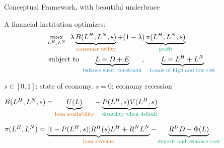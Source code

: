 \documentclass[notes,11pt, aspectratio=169]{beamer}
\newenvironment{wideitemize}{\itemize\addtolength{\itemsep}{10pt}}{\enditemize}  %
\begin{document}
\begin{frame}{Conceptual Framework, with beautiful underbrace}

A financial institution optimizes:
\begin{align*}
	& \max_{L^H, L^N}  \:\:  \lambda \underbrace{ B(L^H,L^N, s)}_{\text{\textcolor{red}{consumer utility}}} + (1-\lambda) \underbrace{ \pi(L^H, L^N,s)}_{\text{\textcolor{green}{profit}}} \\
	& \text{ subject to  } \underbrace{L = D + E}_{\text{\textcolor{blue}{balance sheet constraint}}}, \:\:\: \underbrace{L = L^H + L^N}_{\text{\textcolor{blue}{Loans of high and low risk}}} 
\end{align*}
\begin{wideitemize}
    \item <1-> $s \in [0,1]$: state of economy. $s=0$: economy recession
    \item <2-> $B(L^H, L^N, s)= \underbrace{U(L)}_{\text{\textcolor{red}{loan availability}}}-\underbrace{P(L^H, s) V(L^H,s)}_{\text{\textcolor{green}{disutility when default}}}$ 
	\item <3> $\pi(L^H, L^N)  = \underbrace{[1-P(L^H, s)]R^H(s) L^H + R^N L^N}_{\text{\textcolor{red}{loan revenue}}} - \underbrace{R^D D -\Phi(L)}_{\text{\textcolor{green}{deposit and issuance cost}}}$
\end{wideitemize}
\end{frame}
\end{document}
